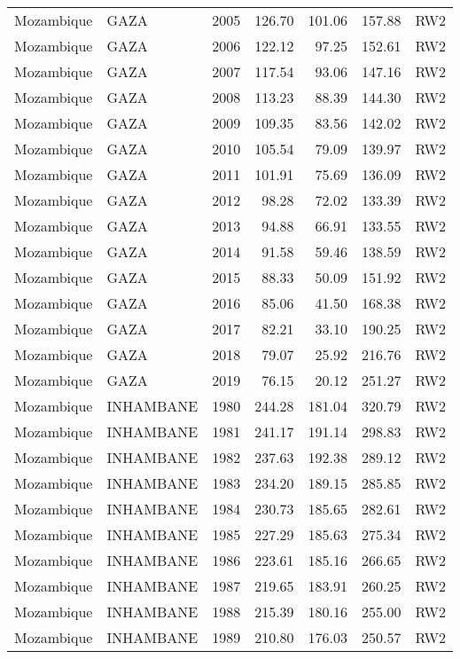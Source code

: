 \begin{longtable}{lllrrrl}
  Mozambique & GAZA & 2005 & 126.70 & 101.06 & 157.88 & RW2 \\ 
  Mozambique & GAZA & 2006 & 122.12 & 97.25 & 152.61 & RW2 \\ 
  Mozambique & GAZA & 2007 & 117.54 & 93.06 & 147.16 & RW2 \\ 
  Mozambique & GAZA & 2008 & 113.23 & 88.39 & 144.30 & RW2 \\ 
  Mozambique & GAZA & 2009 & 109.35 & 83.56 & 142.02 & RW2 \\ 
  Mozambique & GAZA & 2010 & 105.54 & 79.09 & 139.97 & RW2 \\ 
  Mozambique & GAZA & 2011 & 101.91 & 75.69 & 136.09 & RW2 \\ 
  Mozambique & GAZA & 2012 & 98.28 & 72.02 & 133.39 & RW2 \\ 
  Mozambique & GAZA & 2013 & 94.88 & 66.91 & 133.55 & RW2 \\ 
  Mozambique & GAZA & 2014 & 91.58 & 59.46 & 138.59 & RW2 \\ 
  Mozambique & GAZA & 2015 & 88.33 & 50.09 & 151.92 & RW2 \\ 
  Mozambique & GAZA & 2016 & 85.06 & 41.50 & 168.38 & RW2 \\ 
  Mozambique & GAZA & 2017 & 82.21 & 33.10 & 190.25 & RW2 \\ 
  Mozambique & GAZA & 2018 & 79.07 & 25.92 & 216.76 & RW2 \\ 
  Mozambique & GAZA & 2019 & 76.15 & 20.12 & 251.27 & RW2 \\ 
  Mozambique & INHAMBANE & 1980 & 244.28 & 181.04 & 320.79 & RW2 \\ 
  Mozambique & INHAMBANE & 1981 & 241.17 & 191.14 & 298.83 & RW2 \\ 
  Mozambique & INHAMBANE & 1982 & 237.63 & 192.38 & 289.12 & RW2 \\ 
  Mozambique & INHAMBANE & 1983 & 234.20 & 189.15 & 285.85 & RW2 \\ 
  Mozambique & INHAMBANE & 1984 & 230.73 & 185.65 & 282.61 & RW2 \\ 
  Mozambique & INHAMBANE & 1985 & 227.29 & 185.63 & 275.34 & RW2 \\ 
  Mozambique & INHAMBANE & 1986 & 223.61 & 185.16 & 266.65 & RW2 \\ 
  Mozambique & INHAMBANE & 1987 & 219.65 & 183.91 & 260.25 & RW2 \\ 
  Mozambique & INHAMBANE & 1988 & 215.39 & 180.16 & 255.00 & RW2 \\ 
  Mozambique & INHAMBANE & 1989 & 210.80 & 176.03 & 250.57 & RW2 \\ 

\end{longtable}
